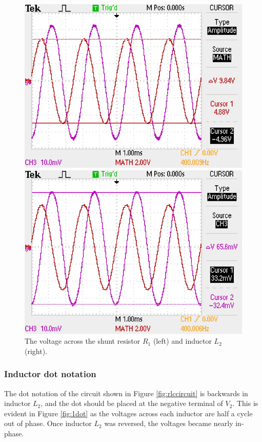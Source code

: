 \documentclass{report}
\begin{document}
\begin{figure}[H]
	\begin{minipage}{0.5\linewidth}
		\includegraphics[width=\linewidth]{scope/sine_vr}
	\end{minipage}
	\begin{minipage}{0.5\linewidth}
		\includegraphics[width=\linewidth]{scope/sine_v2}
	\end{minipage}
	\caption{The voltage across the shunt resistor $R_1$ (left) and inductor $L_2$ (right).}
	\label{fig:1scopesine}
\end{figure}

\subsubsection{Inductor dot notation}
The dot notation of the circuit shown in Figure \ref{fig:rlccircuit} is backwards in inductor $L_2$, and the dot should be placed at the negative terminal of $V_2$. This is evident in Figure \ref{fig:1dot} as the voltages across each inductor are half a cycle out of phase. Once inductor $L_2$ was reversed, the voltages became nearly in-phase.
\end{document}
